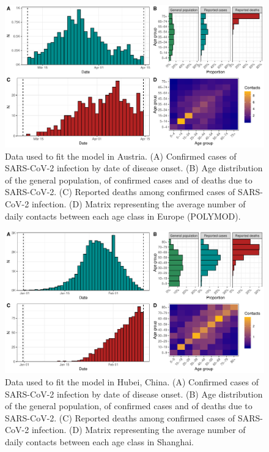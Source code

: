 \documentclass{article}
\begin{document}
\begin{figure}[h]
		\centering
		\includegraphics[width=15cm]{../format_output/figures/data_austria.pdf}
		\caption{Data used to fit the model in Austria. (A) Confirmed cases of SARS-CoV-2 infection by date of disease onset. (B) Age distribution of the general population, of confirmed cases and of deaths due to SARS-CoV-2. (C) Reported deaths among confirmed cases of SARS-CoV-2 infection. (D) Matrix representing the average number of daily contacts between each age class in Europe (POLYMOD).}
		\label{fig:austria}
\end{figure}

\begin{figure}[h]
		\centering
		\includegraphics[width=15cm]{../format_output/figures/data_china.pdf}
		\caption{Data used to fit the model in Hubei, China.  (A) Confirmed cases of SARS-CoV-2 infection by date of disease onset. (B) Age distribution of the general population, of confirmed cases and of deaths due to SARS-CoV-2. (C) Reported deaths among confirmed cases of SARS-CoV-2 infection. (D) Matrix representing the average number of daily contacts between each age class in Shanghai.}
		\label{fig:china}
\end{figure}
\end{document}
